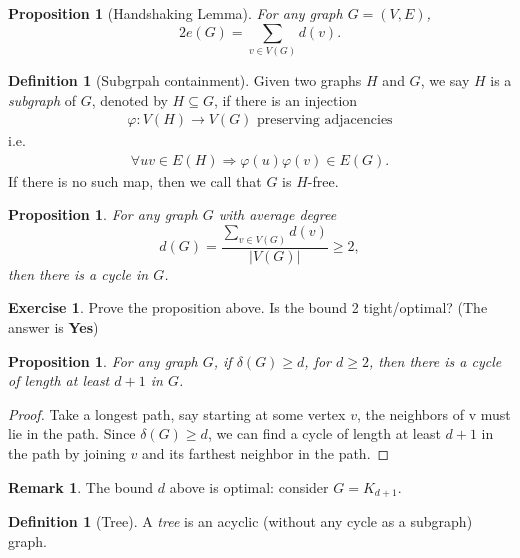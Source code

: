 \documentclass{article}
\newtheorem{proposition}[theorem]{Proposition}
\theoremstyle{definition}
\newtheorem{remark}[theorem]{Remark}
\newtheorem{definition}[theorem]{Definition}
\newtheorem{exercise}[theorem]{Exercise}
\renewcommand{\phi}{\varphi}
\begin{document}
\begin{proposition}[Handshaking Lemma]
    For any graph $G = (V, E)$,
    \[ 2 e(G) = \sum_{v\in V(G)} d(v). \]
\end{proposition}

\begin{definition}[Subgrpah containment]
    Given two graphs $H$ and $G$, we say $H$ is a \emph{subgraph} of $G$, denoted by $H\subseteq G$, if there is an injection
    \begin{align*}
        \phi: V(H)\rightarrow V(G) \text{ preserving adjacencies}
    \end{align*}
    i.e.
    \begin{align*}
        \forall uv\in E(H) \Rightarrow \phi(u)\phi(v)\in E(G).
    \end{align*}
    If there is no such map, then we call that $G$ is $H$-free.
\end{definition}

\begin{proposition}
   For any graph $G$ with average degree
   \[ d(G) = \frac{\sum_{v\in V(G)} d(v)}{|V(G)|}\geq 2, \]
   then there is a cycle in $G$.
\end{proposition}

\begin{exercise}
    Prove the proposition above.
    Is the bound 2 tight/optimal? (The answer is \textbf{Yes})
\end{exercise}

\begin{proposition}
    For any graph $G$, if $\delta(G)\geq d$, for $d \geq 2$, then there is a cycle of length at least $d + 1$ in $G$.
\end{proposition}

\begin{proof}
    Take a longest path, say starting at some vertex $v$, the neighbors of v must lie in the path. Since $\delta(G)\ge d$, we can find a cycle of length at least $d+1$ in the path by joining $v$ and its farthest neighbor in the path.
\end{proof}

\begin{remark}
    The bound $d$ above is optimal: consider $G=K_{d+1}$.
\end{remark}

\begin{definition}[Tree]
    A \emph{tree} is an acyclic (without any cycle as a subgraph) graph.
\end{definition}
\end{document}
